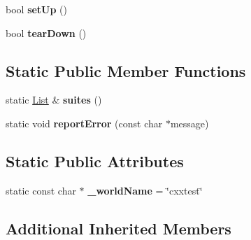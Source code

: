 \begin{DoxyCompactItemize}
\item 
\hypertarget{classCxxTest_1_1RealWorldDescription_a0e5c1168073ab7f75439d2d56561abb7}{bool {\bfseries set\-Up} ()}\label{classCxxTest_1_1RealWorldDescription_a0e5c1168073ab7f75439d2d56561abb7}

\item 
\hypertarget{classCxxTest_1_1RealWorldDescription_ac3285f884a779c0d7d371a284fd8e19f}{bool {\bfseries tear\-Down} ()}\label{classCxxTest_1_1RealWorldDescription_ac3285f884a779c0d7d371a284fd8e19f}

\end{DoxyCompactItemize}
\subsection*{Static Public Member Functions}
\begin{DoxyCompactItemize}
\item 
\hypertarget{classCxxTest_1_1RealWorldDescription_a8c1e967356e4c7ffb09d2ab411f168c9}{static \hyperlink{structCxxTest_1_1List}{List} \& {\bfseries suites} ()}\label{classCxxTest_1_1RealWorldDescription_a8c1e967356e4c7ffb09d2ab411f168c9}

\item 
\hypertarget{classCxxTest_1_1RealWorldDescription_ac6226291ebf9799da9909e5c3ff56c55}{static void {\bfseries report\-Error} (const char $\ast$message)}\label{classCxxTest_1_1RealWorldDescription_ac6226291ebf9799da9909e5c3ff56c55}

\end{DoxyCompactItemize}
\subsection*{Static Public Attributes}
\begin{DoxyCompactItemize}
\item 
\hypertarget{classCxxTest_1_1RealWorldDescription_a7997ad94218e4a654a88204c4671563d}{static const char $\ast$ {\bfseries \-\_\-world\-Name} = \char`\"{}cxxtest\char`\"{}}\label{classCxxTest_1_1RealWorldDescription_a7997ad94218e4a654a88204c4671563d}

\end{DoxyCompactItemize}
\subsection*{Additional Inherited Members}


